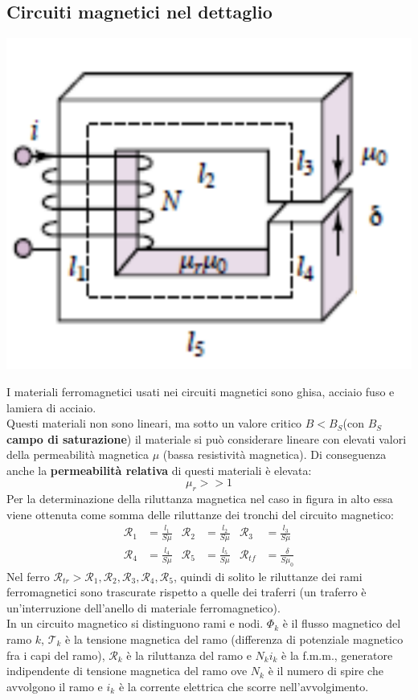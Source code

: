 \documentclass{article}
\begin{document}
\subsection{Circuiti magnetici nel dettaglio}
\begin{center}
    \includegraphics[scale=0.27]{Image/Circuiti_magnetici_dettaglio_1.png}
\end{center}
I materiali ferromagnetici usati nei circuiti magnetici sono ghisa, acciaio fuso e lamiera di acciaio.\\
Questi materiali non sono lineari, ma sotto un valore critico $B <B_S$(con $B_S$ \textbf{campo di saturazione}) il materiale si può considerare lineare con elevati valori della permeabilità magnetica $\mu$ (bassa resistività magnetica). Di conseguenza anche la \textbf{permeabilità relativa} di questi materiali è elevata:
\[
    \mu_r >>1
\]
Per la determinazione della riluttanza magnetica nel caso in figura in alto essa viene ottenuta come somma delle riluttanze dei tronchi del circuito magnetico:
\begin{align*}
    \mathcal{R}_1 &= \frac{l_1}{S \mu} & \mathcal{R}_2 &= \frac{l_2}{S \mu} & \mathcal{R}_3 &= \frac{l_3}{S \mu}
    \\
    \mathcal{R}_4 &= \frac{l_4}{S \mu} &
    \mathcal{R}_5 &= \frac{l_5}{S \mu} &
    \mathcal{R}_{tf} &= \frac{\delta}{S \mu_0}
\end{align*}
Nel ferro $\mathcal{R}_{tr}>\mathcal{R}_1,\mathcal{R}_2,\mathcal{R}_3,\mathcal{R}_4,\mathcal{R}_5$, quindi di solito le riluttanze dei rami ferromagnetici sono trascurate rispetto a quelle dei traferri (un traferro è un'interruzione dell'anello di materiale ferromagnetico).
\vspace*{0.2cm}\\
In un circuito magnetico si distinguono rami e nodi. $\Phi_k$ è il flusso magnetico del
ramo $k$, $\mathcal{T}_k$ è la tensione magnetica del ramo (differenza di potenziale magnetico fra i capi del ramo), $\mathcal{R}_k$ è la riluttanza del ramo e $N_ki_k$ è la f.m.m., generatore indipendente di tensione magnetica del ramo ove $N_k$ è il numero di spire che avvolgono il ramo e $i_k$ è la corrente elettrica che scorre nell'avvolgimento.
\end{document}

